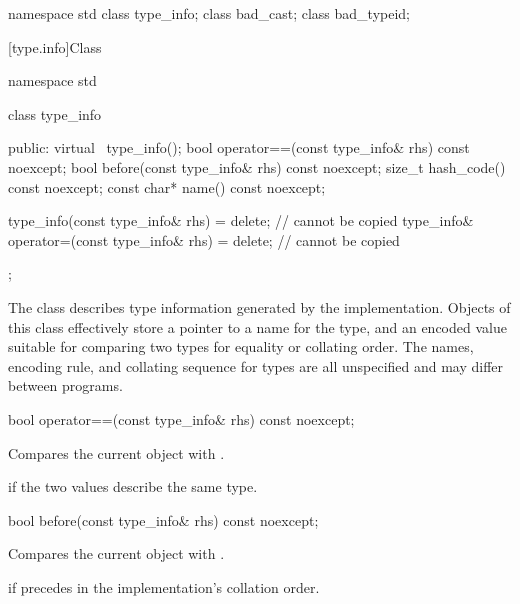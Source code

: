 \begin{codeblock}
namespace std {
  class type_info;
  class bad_cast;
  class bad_typeid;
}
\end{codeblock}

[type.info]{Class }

%
\begin{codeblock}
namespace std {
  class type_info {
  public:
    virtual ~type_info();
    bool operator==(const type_info& rhs) const noexcept;
    bool before(const type_info& rhs) const noexcept;
    size_t hash_code() const noexcept;
    const char* name() const noexcept;

    type_info(const type_info& rhs) = delete;                   // cannot be copied
    type_info& operator=(const type_info& rhs) = delete;        // cannot be copied
  };
}
\end{codeblock}

\pnum
The class
describes type information generated by the implementation.
Objects of this class effectively store a pointer to a name for the type, and
an encoded value suitable for comparing two types for equality or collating order.
The names, encoding rule, and collating sequence for types are all unspecified
%
and may differ between programs.

%
\begin{itemdecl}
bool operator==(const type_info& rhs) const noexcept;
\end{itemdecl}

\begin{itemdescr}
\pnum
\effects
Compares the current object with .

\pnum
\returns
{}
if the two values describe the same type.
\end{itemdescr}

%
\begin{itemdecl}
bool before(const type_info& rhs) const noexcept;
\end{itemdecl}

\begin{itemdescr}
\pnum
\effects
Compares the current object with .

\pnum
\returns
{}
if
precedes  in the implementation's collation order.
\end{itemdescr}

